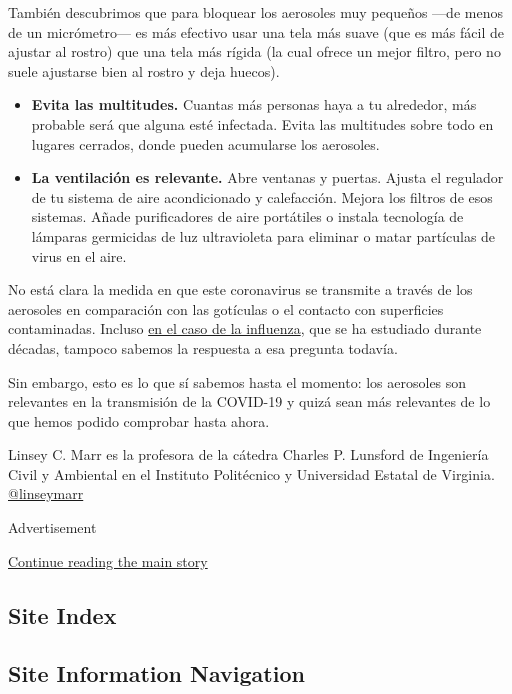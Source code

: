 También descubrimos que para bloquear los aerosoles muy pequeños ---de
menos de un micrómetro--- es más efectivo usar una tela más suave (que
es más fácil de ajustar al rostro) que una tela más rígida (la cual
ofrece un mejor filtro, pero no suele ajustarse bien al rostro y deja
huecos).

\begin{itemize}
\item
  \textbf{Evita las multitudes.} Cuantas más personas haya a tu
  alrededor, más probable será que alguna esté infectada. Evita las
  multitudes sobre todo en lugares cerrados, donde pueden acumularse los
  aerosoles.
\item
  \textbf{La ventilación es relevante.} Abre ventanas y puertas. Ajusta
  el regulador de tu sistema de aire acondicionado y calefacción. Mejora
  los filtros de esos sistemas. Añade purificadores de aire portátiles o
  instala tecnología de lámparas germicidas de luz ultravioleta para
  eliminar o matar partículas de virus en el aire.
\end{itemize}

No está clara la medida en que este coronavirus se transmite a través de
los aerosoles en comparación con las gotículas o el contacto con
superficies contaminadas. Incluso
\href{https://journals.plos.org/plospathogens/article?id=10.1371/journal.ppat.1008704}{en
el caso de la influenza}, que se ha estudiado durante décadas, tampoco
sabemos la respuesta a esa pregunta todavía.

Sin embargo, esto es lo que sí sabemos hasta el momento: los aerosoles
son relevantes en la transmisión de la COVID-19 y quizá sean más
relevantes de lo que hemos podido comprobar hasta ahora.

Linsey C. Marr es la profesora de la cátedra Charles P. Lunsford de
Ingeniería Civil y Ambiental en el Instituto Politécnico y Universidad
Estatal de Virginia.
\href{https://twitter.com/linseymarr?lang=en}{@linseymarr}

Advertisement

\protect\hyperlink{after-bottom}{Continue reading the main story}

\hypertarget{site-index}{%
\subsection{Site Index}\label{site-index}}

\hypertarget{site-information-navigation}{%
\subsection{Site Information
Navigation}\label{site-information-navigation}}

